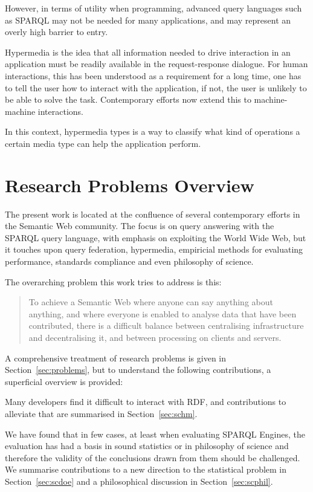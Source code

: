 However, in terms of utility when programming, advanced query
languages such as SPARQL may not be needed for many applications, and
may represent an overly high barrier to entry.

Hypermedia is the idea that all information needed to drive
interaction in an application must be readily available in the
request-response dialogue. For human interactions, this has been
understood as a requirement for a long time, one has to tell the user
how to interact with the application, if not, the user is unlikely to
be able to solve the task. Contemporary efforts now extend this to
machine-machine interactions. 

In this context, hypermedia types is a way to classify what kind of
operations a certain media type can help the application perform.

\section{Research Problems Overview}\label{sec:problemsum}

The present work is located at the confluence of several contemporary
efforts in the Semantic Web community. The focus is on query answering
with the SPARQL query language, with emphasis on exploiting the World
Wide Web, but it touches upon query federation, hypermedia, empiricial
methods for evaluating performance, standards compliance and even
philosophy of science.

The overarching problem this work tries to address is this:

\begin{framed}
\begin{quote}
To achieve a Semantic Web where anyone can say anything about
anything, and where everyone is enabled to analyse data that have been
contributed, there is a difficult balance between centralising
infrastructure and decentralising it, and between processing on
clients and servers.
\end{quote}
\end{framed}

A comprehensive treatment of research problems is given in
Section~\ref{sec:problems}, but to understand the following
contributions, a superficial overview is provided:

Many developers find it difficult to interact with RDF, and
contributions to alleviate that are summarised in
Section~\ref{sec:schm}. 

We have found that in few cases, at least when evaluating SPARQL
Engines, the evaluation has had a basis in sound statistics or in
philosophy of science and therefore the validity of the conclusions
drawn from them should be challenged. We summarise contributions to a
new direction to the statistical problem in Section~\ref{sec:scdoe}
and a philosophical discussion in Section~\ref{sec:scphil}.

